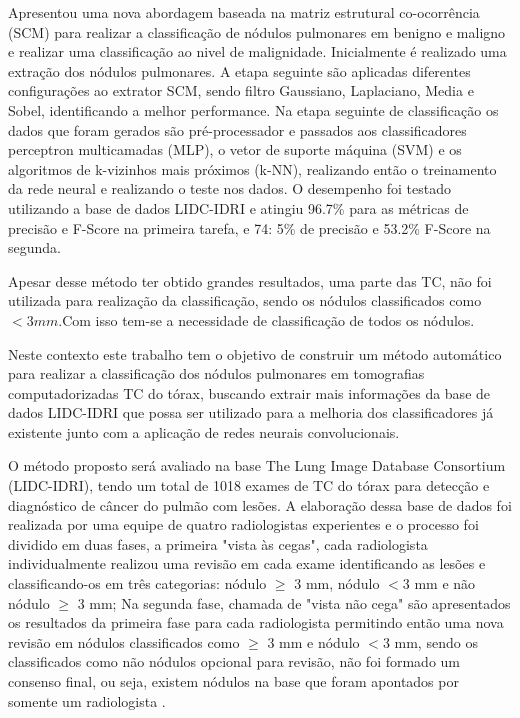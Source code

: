 Apresentou uma nova abordagem baseada na matriz estrutural co-ocorrência (SCM) para realizar a classificação de nódulos pulmonares em benigno e maligno e realizar uma classificação ao nivel de malignidade. Inicialmente  é realizado uma extração dos nódulos pulmonares. A etapa seguinte são aplicadas diferentes configurações ao extrator SCM, sendo filtro Gaussiano, Laplaciano, Media e Sobel, identificando a melhor performance. Na etapa seguinte de classificação os dados que foram gerados são pré-processador e passados aos classificadores perceptron multicamadas (MLP), o vetor de suporte máquina (SVM) e os algoritmos de k-vizinhos mais próximos (k-NN), realizando então o treinamento da rede neural e realizando o teste nos dados. O desempenho foi testado utilizando a base de dados LIDC-IDRI e atingiu 96.7\% para as métricas de precisão e F-Score na primeira tarefa, e 74: 5\% de precisão e 53.2\% F-Score na segunda.


Apesar desse método ter obtido grandes resultados, uma parte das TC, não foi utilizada para realização da classificação, sendo os nódulos classificados como $ < 3 mm$.Com isso tem-se a necessidade de classificação de todos os nódulos.

Neste contexto este trabalho tem o objetivo de construir um método automático para realizar a classificação dos nódulos pulmonares em tomografias computadorizadas TC do tórax, buscando extrair mais informações da base de dados  LIDC-IDRI que possa ser utilizado para a melhoria dos classificadores já existente junto com a aplicação de redes neurais convolucionais.

O método proposto será avaliado na base The Lung Image Database Consortium (LIDC-IDRI), tendo um total de 1018 exames de TC do tórax para detecção e diagnóstico de câncer do pulmão com lesões. A elaboração dessa base de dados foi realizada por uma equipe de quatro radiologistas experientes e o processo foi dividido em duas fases, a primeira "vista às cegas", cada radiologista individualmente realizou uma revisão em cada exame identificando as lesões e classificando-os em três categorias: nódulo $\geq$ 3 mm, nódulo  $< 3$ mm e não nódulo $\geq$ 3 mm; Na segunda fase, chamada de "vista não cega" são apresentados os resultados da primeira fase para cada radiologista permitindo então uma nova revisão em nódulos classificados como $\geq$ 3 mm e nódulo  $< 3$ mm, sendo os classificados como não nódulos opcional para revisão, não foi formado um consenso final, ou seja, existem nódulos na base que foram apontados por somente um radiologista \cite{teste2}.

